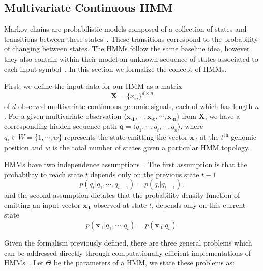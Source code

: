 \subsection{Multivariate Continuous HMM}
\label{sec:multivariate.continuous.hmm}

Markov chains are probabilistic models composed of a collection of states and transitions between these states~\citep{rabiner1989}. These transitions correspond to the probability of changing between states. The HMMs follow the same baseline idea, however they also contain within their model an unknown sequence of states associated to each input symbol~\citep{rabiner1989,durbin1998}. In this section we formalize the concept of HMMs.

First, we define the input data for our HMM as a matrix
\begin{equation}
  \label{eq:hmm.input.data}
  \mathbf{X} = \{x_{ij}\}^{d \times n}
\end{equation}
of $d$ observed multivariate continuous genomic signals, each of which has length $n$. For a given multivariate observation $\langle \mathbf{{x}_{\cdot 1}}, \cdots, \mathbf{{x}_{\cdot t}}, \cdots, \mathbf{{x}_{\cdot n}} \rangle$ from $\mathbf{X}$, we have a corresponding hidden sequence path $\mathbf{q} = \langle q_1, \cdots, q_t, \cdots, q_n \rangle$, where $ q_t \in W = \{1, \cdots, w\} $ represents the state emitting the vector $ {\mathbf{x}}_{\cdot t} $ at the $t^{\text{th}}$ genomic position and $w$ is the total number of states given a particular HMM topology.

HMMs have two independence assumptions~\citep{rabiner1989}. The first assumption is that the probability to reach state $t$ depends only on the previous state $t-1$
\begin{equation}
  \label{eq:hmm.indep.1}
  p(q_t | q_1, \cdots, q_{t-1}) = p(q_t | q_{t-1}),
\end{equation}
and the second assumption dictates that the probability density function of emitting an input vector $\mathbf{{x}_{\cdot t}}$ observed at state $t$, depends only on this current state
\begin{equation}
  \label{eq:hmm.indep.2}
  p(\mathbf{{x}_{\cdot t}} | q_1, \cdots, q_t) = p(\mathbf{{x}_{\cdot t}} | q_t).
\end{equation}

Given the formalism previously defined, there are three general problems which can be addressed directly through computationally efficient implementations of HMMs~\citep{durbin1998}. Let $\Theta$ be the parameters of a HMM, we state these problems as:

